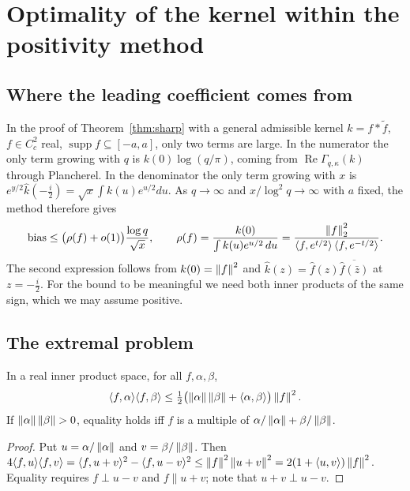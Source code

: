 \section{Optimality of the kernel within the positivity method}\label{sec:optimality}

\subsection{Where the leading coefficient comes from}
In the proof of Theorem~\ref{thm:sharp} with a general admissible kernel $k=f*\tilde f$, $f\in C^2_c$ real,
$\operatorname{supp}f\subseteq[-a,a]$, only two terms are large. In the numerator the only term growing with
$q$ is $k(0)\log(q/\pi)$, coming from $\operatorname{Re}\Gamma_{q,\kappa}(k)$ through Plancherel. In the
denominator the only term growing with $x$ is $e^{y/2}\hat k(-\frac i2)=\sqrt x\int k(u)e^{u/2}du$. As $q\to\infty$
and $x/\log^2q\to\infty$ with $a$ fixed, the method therefore gives
\begin{equation}\label{eq:leading}
  \operatorname{bias}\le\bigl(\rho(f)+o(1)\bigr)\frac{\log q}{\sqrt x},\qquad
  \rho(f)=\frac{k(0)}{\int k(u)e^{u/2}\,du}=\frac{\left\lVert f \right\rVert_2^2}{\langle f,e^{t/2}\rangle\,\langle f,e^{-t/2}\rangle}.
\end{equation}
The second expression follows from $k(0)=\left\lVert f \right\rVert^2$ and $\hat k(z)=\hat f(z)\overline{\hat f(\bar z)}$ at $z=-\frac i2$.
For the bound to be meaningful we need both inner products of the same sign, which we may assume positive.

\subsection{The extremal problem}
\begin{lemma}\label{lem:ranktwo}
In a real inner product space, for all $f,\alpha,\beta$,
\[
  \langle f,\alpha\rangle\langle f,\beta\rangle\le\tfrac12\bigl(\left\lVert \alpha \right\rVert\left\lVert \beta \right\rVert+\langle\alpha,\beta\rangle\bigr)\left\lVert f \right\rVert^2 .
\]
If $\left\lVert \alpha \right\rVert\left\lVert \beta \right\rVert>0$, equality holds iff $f$ is a multiple of $\alpha/\left\lVert \alpha \right\rVert+\beta/\left\lVert \beta \right\rVert$.
\end{lemma}
\begin{proof}
Put $u=\alpha/\left\lVert \alpha \right\rVert$ and $v=\beta/\left\lVert \beta \right\rVert$. Then
$4\langle f,u\rangle\langle f,v\rangle=\langle f,u+v\rangle^2-\langle f,u-v\rangle^2\le\left\lVert f \right\rVert^2\left\lVert u+v \right\rVert^2=2(1+\langle u,v\rangle)\left\lVert f \right\rVert^2$.
Equality requires $f\perp u-v$ and $f\parallel u+v$; note that $u+v\perp u-v$.
\end{proof}


